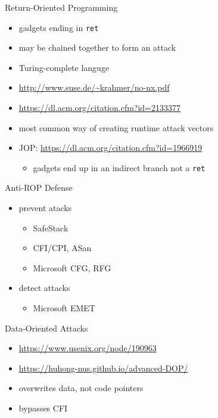 \documentclass{curs}
\begin{document}
\begin{frame}{Return-Oriented Programming}
  \begin{itemize}
    \item gadgets ending in \texttt{ret}
    \item may be chained together to form an attack
    \item Turing-complete languge
    \item \url{http://www.suse.de/~krahmer/no-nx.pdf}
    \item \url{https://dl.acm.org/citation.cfm?id=2133377}
    \item most common way of creating runtime attack vectors
    \item JOP: \url{https://dl.acm.org/citation.cfm?id=1966919}
      \begin{itemize}
        \item gadgets end up in an indirect branch not a \texttt{ret}
      \end{itemize}
  \end{itemize}
\end{frame}

\begin{frame}{Anti-ROP Defense}
  \begin{itemize}
    \item prevent atacks
      \begin{itemize}
        \item SafeStack
        \item CFI/CPI, ASan
        \item Microsoft CFG, RFG
      \end{itemize}
    \item detect attacks
      \begin{itemize}
        \item Microsoft EMET
      \end{itemize}
  \end{itemize}
\end{frame}

\begin{frame}{Data-Oriented Attacks}
  \begin{itemize}
    \item \url{https://www.usenix.org/node/190963}
    \item \url{https://huhong-nus.github.io/advanced-DOP/}
    \item overwrites data, not code pointers
    \item bypasses CFI
  \end{itemize}
\end{frame}
\end{document}
